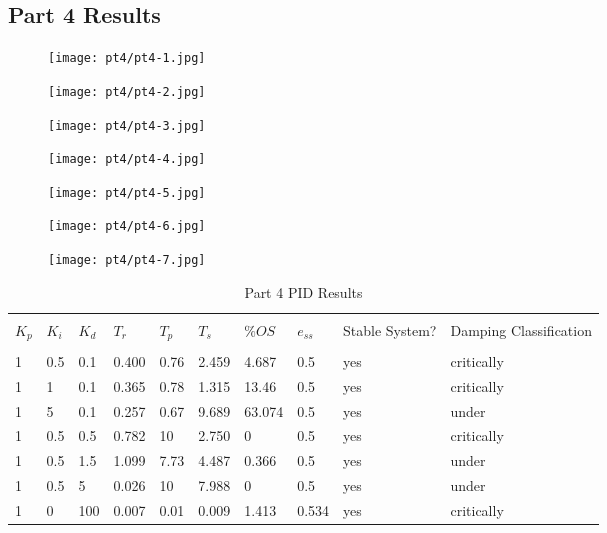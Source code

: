 \subsection{Part 4 Results}
\begin{figure}[H]
	\texttt{[image: pt4/pt4-1.jpg]}
\end{figure}
\begin{figure}[H]
	\texttt{[image: pt4/pt4-2.jpg]}
\end{figure}
\begin{figure}[H]
	\texttt{[image: pt4/pt4-3.jpg]}
\end{figure}
\begin{figure}[H]
	\texttt{[image: pt4/pt4-4.jpg]}
\end{figure}
\begin{figure}[H]
	\texttt{[image: pt4/pt4-5.jpg]}
\end{figure}
\begin{figure}[H]
	\texttt{[image: pt4/pt4-6.jpg]}
\end{figure}
\begin{figure}[H]
	\texttt{[image: pt4/pt4-7.jpg]}
\end{figure} 
\begin{table}[H]
	\begin{tabularx}{\textwidth}{XXXXXXXXXX}
		\toprule
		\\ $K_p$ & $K_i$ & $K_d$ & $T_r$ & $T_p$ & $T_s$ & $\%OS$ & $e_{ss}$ 
		& Stable System? & Damping Classification
		\\ \midrule
		\\1&0.5&0.1&0.400&0.76&2.459&4.687&0.5&yes&critically 
\\1&1&0.1&0.365&0.78&1.315&13.46&0.5&yes&critically 
\\1&5&0.1&0.257&0.67&9.689&63.074&0.5&yes&under 
\\1&0.5&0.5&0.782&10&2.750&0&0.5&yes&critically 
\\1&0.5&1.5&1.099&7.73&4.487&0.366&0.5&yes&under 
\\1&0.5&5&0.026&10&7.988&0&0.5&yes&under 
\\1&0&100&0.007&0.01&0.009&1.413&0.534&yes&critically 
		\\ \bottomrule
	\end{tabularx}
	\caption{Part 4 PID Results}
	\label{tab:pid4SimResults}
\end{table}
